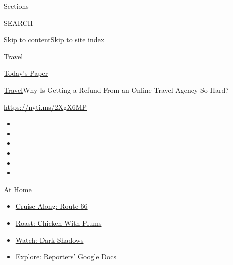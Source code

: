 Sections

SEARCH

\protect\hyperlink{site-content}{Skip to
content}\protect\hyperlink{site-index}{Skip to site index}

\href{https://www.nytimes3xbfgragh.onion/section/travel}{Travel}

\href{https://myaccount.nytimes3xbfgragh.onion/auth/login?response_type=cookie\&client_id=vi}{}

\href{https://www.nytimes3xbfgragh.onion/section/todayspaper}{Today's
Paper}

\href{/section/travel}{Travel}\textbar{}Why Is Getting a Refund From an
Online Travel Agency So Hard?

\url{https://nyti.ms/2XgX6MP}

\begin{itemize}
\item
\item
\item
\item
\item
\item
\end{itemize}

\href{https://www.nytimes3xbfgragh.onion/spotlight/at-home?action=click\&pgtype=Article\&state=default\&region=TOP_BANNER\&context=at_home_menu}{At
Home}

\begin{itemize}
\tightlist
\item
  \href{https://www.nytimes3xbfgragh.onion/2020/09/07/travel/route-66.html?action=click\&pgtype=Article\&state=default\&region=TOP_BANNER\&context=at_home_menu}{Cruise
  Along: Route 66}
\item
  \href{https://www.nytimes3xbfgragh.onion/2020/09/04/dining/sheet-pan-chicken.html?action=click\&pgtype=Article\&state=default\&region=TOP_BANNER\&context=at_home_menu}{Roast:
  Chicken With Plums}
\item
  \href{https://www.nytimes3xbfgragh.onion/2020/09/04/arts/television/dark-shadows-stream.html?action=click\&pgtype=Article\&state=default\&region=TOP_BANNER\&context=at_home_menu}{Watch:
  Dark Shadows}
\item
  \href{https://www.nytimes3xbfgragh.onion/interactive/2020/at-home/even-more-reporters-editors-diaries-lists-recommendations.html?action=click\&pgtype=Article\&state=default\&region=TOP_BANNER\&context=at_home_menu}{Explore:
  Reporters' Google Docs}
\end{itemize}

